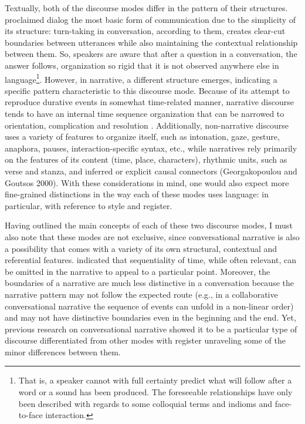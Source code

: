 \documentclass[12pt]{article}
\begin{document}
Textually, both of the discourse modes differ in the pattern of their structures. \textcite{bakhtin1986} proclaimed dialog the most basic form of communication due to the simplicity of its structure: turn-taking in conversation, according to them, creates clear-cut boundaries between utterances while also maintaining the contextual relationship between them. So, speakers are aware that after a question in a conversation, the answer follows, organization so rigid that it is not observed anywhere else in language\footnote{That is, a speaker cannot with full certainty predict what will follow after a word or a sound has been produced. The foreseeable relationships have only been described with regards to some colloquial terms and indioms and face-to-face interaction.}. However, in  narrative, a different structure emerges, indicating a specific pattern characteristic to this discourse mode. Because of its attempt to reproduce durative events in somewhat time-related manner, narrative discourse tends to have an internal time sequence organization that can be narrowed to orientation, complication and resolution \parencite{labov1967}. Additionally, non-narrative discourse uses a variety of features to organize itself, such as intonation, gaze, gesture, anaphora, pauses, interaction-specific syntax, etc., while narratives rely primarily on the features of its content (time, place, characters), rhythmic units, such as verse and stanza, and inferred or explicit causal connectors (Georgakopoulou and Goutsos 2000). With these considerations in mind, one would also expect more fine-grained distinctions in the way each of these modes uses language: in particular, with reference to style and register. 

Having outlined the main concepts of each of these two discourse modes, I must also note that these modes are not exclusive, since conversational narrative is also a possibility that comes with a variety of its own structural, contextual and referential features. \textcite{norrick2000} indicated that sequentiality of time, while often relevant, can be omitted in the narrative to appeal to a particular point. Moreover, the boundaries of a narrative are much less distinctive in a conversation because the narrative pattern may not follow the expected route (e.g., in a collaborative conversational narrative the sequence of events can unfold in a non-linear order) and may not have distinctive boundaries even in the beginning and the end. Yet, previous research on conversational narrative showed it to be a particular type of discourse differentiated from other modes with register unraveling some of the minor differences between them.
\end{document}
